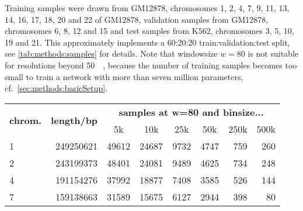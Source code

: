 Training samples were drawn from GM12878, chromosomes 1, 2, 4, 7, 9, 11, 13, 14, 16, 17, 18, 20 and 22 of GM12878, 
validation samples from GM12878, chromosomes 6, 8, 12 and 15 and test samples from K562, chromosomes 3, 5, 10, 19 and 21.
This approximately implements a 60:20:20 train:validation:test split, see \cref{tab:methods:samples} for details.
Note that windowsize $w=80$ is not suitable for resolutions beyond \SI{50}{\kilo\bp}, because the number of training samples becomes too small
to train a network with more than seven million parameters, cf.~\cref{sec:methods:basicSetup}.
\begin{table}[hbp]
\centering
\begin{tabular}{lrrrrrrr}
\hline
\multicolumn{1}{c}{\multirow{2}{*}{\textbf{chrom.}}} & \multicolumn{1}{c}{\multirow{2}{*}{\textbf{length/bp}}} & \multicolumn{6}{c}{\textbf{samples at w=80 and binsize...}}                                                                                                \\
\multicolumn{1}{c}{}                                     & \multicolumn{1}{c}{}                                    & \multicolumn{1}{c}{5k} & \multicolumn{1}{c}{10k} & \multicolumn{1}{c}{25k} & \multicolumn{1}{c}{50k} & \multicolumn{1}{c}{250k} & \multicolumn{1}{c}{500k} \\ \hline
1                                                        & 249250621                                               & 49612                  & 24687                   & 9732                    & 4747                    & 759                      & 260                      \\
2                                                        & 243199373                                               & 48401                  & 24081                   & 9489                    & 4625                    & 734                      & 248                      \\
4                                                        & 191154276                                               & 37992                  & 18877                   & 7408                    & 3585                    & 526                      & 144                      \\
7                                                        & 159138663                                               & 31589                  & 15675                   & 6127                    & 2944                    & 398                      & 80                       \\

\end{tabular}
\end{table}
